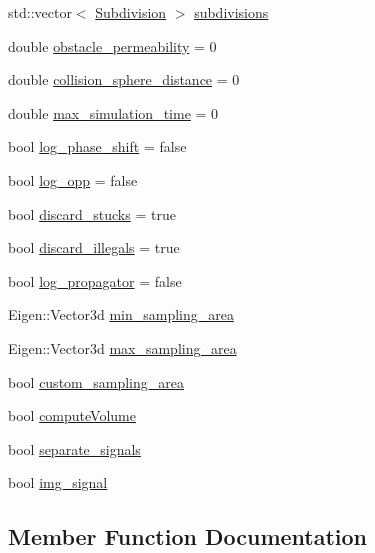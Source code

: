 \begin{DoxyCompactItemize}
\item 
std\+::vector$<$ \hyperlink{class_subdivision}{Subdivision} $>$ \hyperlink{class_parameters_a3c05ff7a30f151c384b83ce3adca26fa}{subdivisions}
\item 
double \hyperlink{class_parameters_a2e5fa275543b4a52599e694e64546e13}{obstacle\+\_\+permeability} = 0
\item 
double \hyperlink{class_parameters_abe008f02a49ef7f7a6f041f79cc81fbb}{collision\+\_\+sphere\+\_\+distance} = 0
\item 
double \hyperlink{class_parameters_a66ad8359ef1cc76e8d5581a402cc86b5}{max\+\_\+simulation\+\_\+time} = 0
\item 
bool \hyperlink{class_parameters_a947e4b1fef66466119ea7b2e8e2bc0e4}{log\+\_\+phase\+\_\+shift} = false
\item 
bool \hyperlink{class_parameters_ae30abbd794dee7f5aaf5d3d51152acef}{log\+\_\+opp} = false
\item 
bool \hyperlink{class_parameters_ab1815ac94d73ca8b56a9f12fca04cb89}{discard\+\_\+stucks} = true
\item 
bool \hyperlink{class_parameters_ac1a5fa4c00eaaf1b40789f329ae20e9a}{discard\+\_\+illegals} = true
\item 
bool \hyperlink{class_parameters_a1f5a62a35d6521994a623d0fd0a98a24}{log\+\_\+propagator} = false
\item 
Eigen\+::\+Vector3d \hyperlink{class_parameters_a8b7e1481e63d5ac9a36eed8ab310d315}{min\+\_\+sampling\+\_\+area}
\item 
Eigen\+::\+Vector3d \hyperlink{class_parameters_a2bf25423e72a562d5812ed0df3e06e2d}{max\+\_\+sampling\+\_\+area}
\item 
bool \hyperlink{class_parameters_af023e7efce57b9da0837731db6a85c87}{custom\+\_\+sampling\+\_\+area}
\item 
bool \hyperlink{class_parameters_a669c92fe7864a00da04bba0c2af93a16}{compute\+Volume}
\item 
bool \hyperlink{class_parameters_adacb13afed18c07dfd269fae76f828b3}{separate\+\_\+signals}
\item 
bool \hyperlink{class_parameters_a1dd221193dd0ad7e34a6b4f7c496d899}{img\+\_\+signal}
\end{DoxyCompactItemize}


\subsection{Member Function Documentation}
\mbox{\label{class_parameters_ac429071159941e3957eb7c030280a30f}} 
